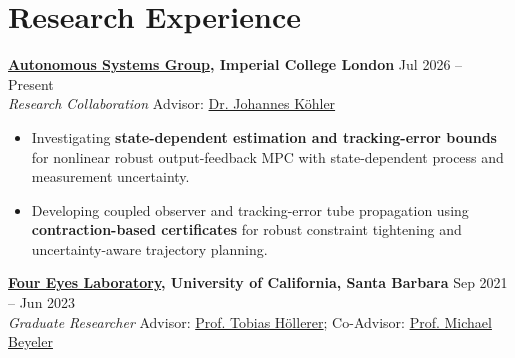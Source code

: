 \documentclass[10pt,letterpaper]{article}
\begin{document}
\section*{Research Experience}


\noindent
\textbf{\href{https://www.imperial.ac.uk/autonomous-systems/}{Autonomous Systems Group}, Imperial College London}
\hfill Jul 2026 -- Present
\\
\textit{Research Collaboration}
\hfill
Advisor: \href{https://profiles.imperial.ac.uk/j.kohler}{Dr. Johannes K\"ohler}

\begin{itemize}

    \item Investigating \textbf{state-dependent estimation and tracking-error bounds}
    for nonlinear robust output-feedback MPC with state-dependent process and measurement uncertainty.

    \item Developing coupled observer and tracking-error tube propagation using
    \textbf{contraction-based certificates} for robust constraint tightening and
    uncertainty-aware trajectory planning.

\end{itemize}

\medskip


\noindent
\textbf{\href{https://four-eyes.github.io/}
{Four Eyes Laboratory}, University of California, Santa Barbara}
\hfill Sep 2021 -- Jun 2023
\\
\textit{Graduate Researcher}
\hfill
Advisor:
\href{https://www.cs.ucsb.edu/~holl/}
{Prof. Tobias H\"ollerer};
Co-Advisor:
\href{https://beyelerlab.ucsb.edu/}
{Prof. Michael Beyeler}
\end{document}
